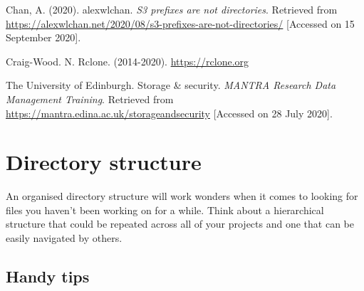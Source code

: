 \documentclass[12pt,a4paper,oneside]{report}
\begin{document}
Chan, A. (2020). alexwlchan. \emph{S3 prefixes are not directories}.
Retrieved from
\url{https://alexwlchan.net/2020/08/s3-prefixes-are-not-directories/}
{[}Accessed on 15 September 2020{]}.

Craig-Wood. N. Rclone. (2014-2020). \url{https://rclone.org}

The University of Edinburgh. Storage \& security. \emph{MANTRA Research
Data Management Training}. Retrieved from
\url{https://mantra.edina.ac.uk/storageandsecurity} {[}Accessed on 28
July 2020{]}.

\hypertarget{directory-structure}{%
\chapter{Directory structure}\label{directory-structure}}

An organised directory structure will work wonders when it comes to
looking for files you haven't been working on for a while. Think about a
hierarchical structure that could be repeated across all of your
projects and one that can be easily navigated by others.

\hypertarget{handy-tips}{%
\section{Handy tips}\label{handy-tips}}
\end{document}
